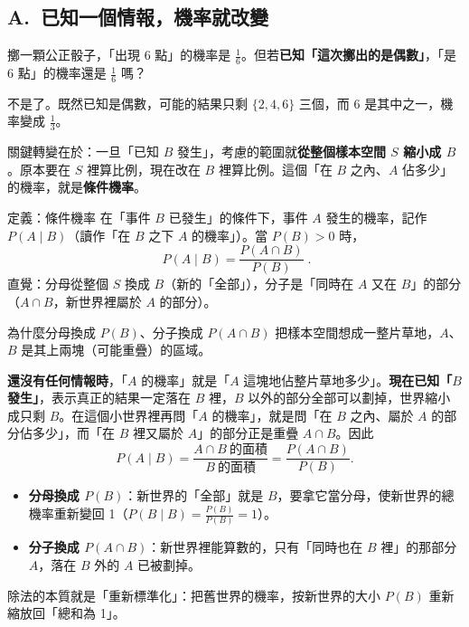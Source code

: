 \documentclass[11pt]{article}
\begin{document}
\subsection*{\sffamily A.\ 已知一個情報，機率就改變}

擲一顆公正骰子，「出現 6 點」的機率是 $\frac16$。但若\textbf{已知「這次擲出的是偶數」}，「是 6 點」的機率還是 $\frac16$ 嗎？

不是了。既然已知是偶數，可能的結果只剩 $\{2,4,6\}$ 三個，而 6 是其中之一，機率變成 $\frac13$。

關鍵轉變在於：一旦「已知 $B$ 發生」，考慮的範圍就\textbf{從整個樣本空間 $S$ 縮小成 $B$}。原本要在 $S$ 裡算比例，現在改在 $B$ 裡算比例。這個「在 $B$ 之內、$A$ 佔多少」的機率，就是\textbf{條件機率}。

\begin{補充框}{定義：條件機率}
在「事件 $B$ 已發生」的條件下，事件 $A$ 發生的機率，記作 $P(A\mid B)$（讀作「在 $B$ 之下 $A$ 的機率」）。當 $P(B)>0$ 時，
$$\boxed{\;P(A\mid B)=\frac{P(A\cap B)}{P(B)}\;}.$$
直覺：分母從整個 $S$ 換成 $B$（新的「全部」），分子是「同時在 $A$ 又在 $B$」的部分（$A\cap B$，新世界裡屬於 $A$ 的部分）。
\end{補充框}


\begin{補充框}{為什麼分母換成 $P(B)$、分子換成 $P(A\cap B)$}
把樣本空間想成一整片草地，$A$、$B$ 是其上兩塊（可能重疊）的區域。

\textbf{還沒有任何情報時}，「$A$ 的機率」就是「$A$ 這塊地佔整片草地多少」。\textbf{現在已知「$B$ 發生」}，表示真正的結果一定落在 $B$ 裡，$B$ 以外的部分全部可以劃掉，世界縮小成只剩 $B$。在這個小世界裡再問「$A$ 的機率」，就是問「在 $B$ 之內、屬於 $A$ 的部分佔多少」，而「在 $B$ 裡又屬於 $A$」的部分正是重疊 $A\cap B$。因此
$$P(A\mid B)=\frac{A\cap B\ \text{的面積}}{B\ \text{的面積}}=\frac{P(A\cap B)}{P(B)}.$$
\begin{itemize}\setlength{\itemsep}{1pt}
\item \textbf{分母換成 $P(B)$}：新世界的「全部」就是 $B$，要拿它當分母，使新世界的總機率重新變回 1（$P(B\mid B)=\frac{P(B)}{P(B)}=1$）。
\item \textbf{分子換成 $P(A\cap B)$}：新世界裡能算數的，只有「同時也在 $B$ 裡」的那部分 $A$，落在 $B$ 外的 $A$ 已被劃掉。
\end{itemize}
除法的本質就是「重新標準化」：把舊世界的機率，按新世界的大小 $P(B)$ 重新縮放回「總和為 1」。
\end{補充框}
\end{document}
